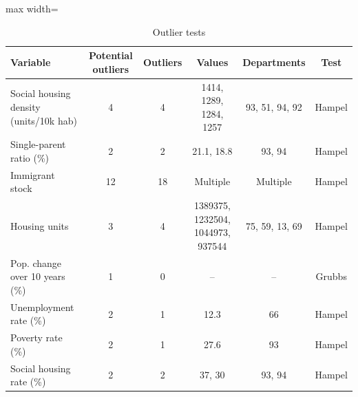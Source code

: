 \begin{table}[ht]
\centering
\caption{Outlier tests} 
\label{tab:outliers}
\begin{adjustbox}{max width=\linewidth}
\begin{tabular}{lccccc}
  \toprule
Variable & Potential outliers & Outliers & Values & Departments & Test \\ 
  \midrule
  Social housing density (units/10k hab) & 4 & 4 & 1414, 1289, 1284, 1257 & 93, 51, 94, 92 & Hampel \\ 
  Single-parent ratio (\%) & 2 & 2 & 21.1, 18.8 & 93, 94 & Hampel \\ 
  Immigrant stock & 12 & 18 & Multiple & Multiple & Hampel \\ 
  Housing units & 3 & 4 & 1389375, 1232504, 1044973, 937544 & 75, 59, 13, 69 & Hampel \\ 
  Pop. change over 10 years (\%) & 1 & 0 & -- & -- & Grubbs \\ 
  Unemployment rate (\%) & 2 & 1 & 12.3 & 66 & Hampel \\ 
  Poverty rate (\%) & 2 & 1 & 27.6 & 93 & Hampel \\ 
  Social housing rate (\%) & 2 & 2 & 37, 30 & 93, 94 & Hampel \\ 
   \bottomrule
\end{tabular}
\end{adjustbox}
\end{table}